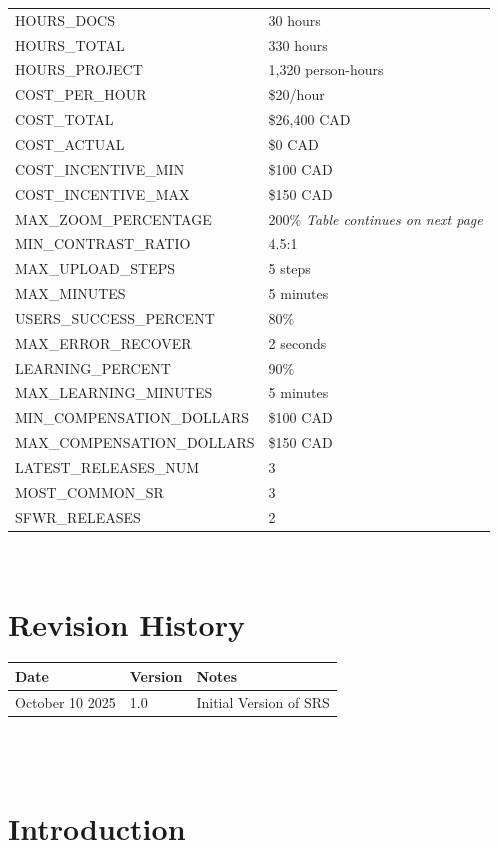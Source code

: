 \documentclass[12pt]{article}
\begin{document}
\begin{longtable}{|p{8.0cm}|p{8.0cm}|}
HOURS\_DOCS & 30 hours \\
HOURS\_TOTAL & 330 hours \\
HOURS\_PROJECT & 1,320 person-hours \\
COST\_PER\_HOUR & \$20/hour \\
COST\_TOTAL & \$26,400 CAD \\
COST\_ACTUAL & \$0 CAD \\
COST\_INCENTIVE\_MIN & \$100 CAD \\
COST\_INCENTIVE\_MAX & \$150 CAD \\
MAX\_ZOOM\_PERCENTAGE & 200\% \qquad\textit{Table continues on next page}\\
MIN\_CONTRAST\_RATIO & 4.5:1\\
MAX\_UPLOAD\_STEPS & 5 steps\\
MAX\_MINUTES & 5 minutes\\
USERS\_SUCCESS\_PERCENT & 80\%\\
MAX\_ERROR\_RECOVER & 2 seconds \\
LEARNING\_PERCENT & 90\% \\
MAX\_LEARNING\_MINUTES & 5 minutes \\
MIN\_COMPENSATION\_DOLLARS & \$100 CAD \\ 
MAX\_COMPENSATION\_DOLLARS & \$150 CAD \\ 
LATEST\_RELEASES\_NUM & 3 \\
MOST\_COMMON\_SR & 3 \\
SFWR\_RELEASES & 2 \\


\bottomrule
\end{longtable}
    


~\newpage

\section*{Revision History}

\begin{tabularx}{\textwidth}{p{3cm}p{2cm}X}
  \toprule {\textbf{Date}} & {\textbf{Version}} & {\textbf{Notes}}\\
  \midrule
  October 10 2025 & 1.0 & Initial Version of SRS\\
  \bottomrule
\end{tabularx}

~\\

~\newpage
\section{Introduction}
\end{document}
